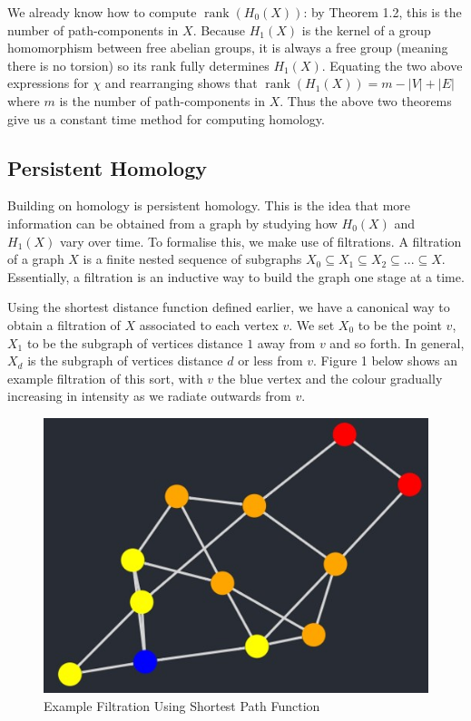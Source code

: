 \documentclass[12pt,a4paper]{amsart}
\numberwithin{equation}{section}
\def\rank{\operatorname{rank}}
\theoremstyle{plain}
\theoremstyle{definition}
\begin{document}
We already know how to compute $\rank(H_0(X))$: by Theorem 1.2, this is the number of path-components in $X$. Because $H_1(X)$ is the kernel of a group homomorphism between free abelian groups, it is always a free group (meaning there is no torsion) so its rank fully determines $H_1(X)$. Equating the two above expressions for $\chi$ and rearranging shows that $\rank(H_1(X)) = m - |V| + |E|$ where $m$ is the number of path-components in $X$. Thus the above two theorems give us a constant time method for computing homology.

\subsection{Persistent Homology}

Building on homology is persistent homology. This is the idea that more information can be obtained from a graph by studying how $H_0(X)$ and $H_1(X)$ vary over time. To formalise this, we make use of filtrations. A filtration of a graph $X$ is a finite nested sequence of subgraphs $X_0 \subseteq X_1 \subseteq X_2 \subseteq ... \subseteq X$. Essentially, a filtration is an inductive way to build the graph one stage at a time. 

Using the shortest distance function defined earlier, we have a canonical way to obtain a filtration of $X$ associated to each vertex $v$. We set $X_0$ to be the point $v$, $X_1$ to be the subgraph of vertices distance $1$ away from $v$ and so forth. In general, $X_d$ is the subgraph of vertices distance $d$ or less from $v$. Figure 1 below shows an example filtration of this sort, with $v$ the blue vertex and the colour gradually increasing in intensity as we radiate outwards from $v$.

\begin{figure}[h]
	\caption{Example Filtration Using Shortest Path Function}
	\centering
	\includegraphics[scale=0.8]{ExampleFiltration.jpg}
\end{figure}
\end{document}
